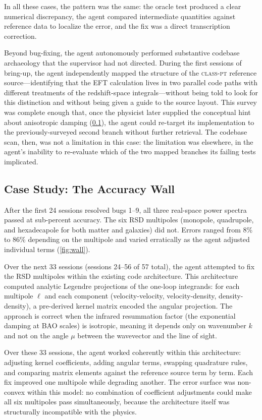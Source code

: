 \documentclass{article}
\newcommand{\classpt}{\textsc{class-pt}\xspace}
\begin{document}
In all these cases, the pattern was the same: the oracle test produced a clear numerical discrepancy, the agent compared intermediate quantities against reference data to localize the error, and the fix was a direct transcription correction.

Beyond bug-fixing, the agent autonomously performed substantive codebase archaeology that the supervisor had not directed. During the first sessions of bring-up, the agent independently mapped the structure of the \classpt reference source---identifying that the EFT calculation lives in two parallel code paths with different treatments of the redshift-space integrals---without being told to look for this distinction and without being given a guide to the source layout. This survey was complete enough that, once the physicist later supplied the conceptual hint about anisotropic damping (\cref{sec:wall}), the agent could re-target its implementation to the previously-surveyed second branch without further retrieval. The codebase scan, then, was not a limitation in this case: the limitation was elsewhere, in the agent's inability to re-evaluate which of the two mapped branches its failing tests implicated.

\subsection{Case Study: The Accuracy Wall}
\label{sec:wall}

After the first 24 sessions resolved bugs 1--9, all three real-space power spectra passed at sub-percent accuracy. The six RSD multipoles (monopole, quadrupole, and hexadecapole for both matter and galaxies) did not. Errors ranged from 8\% to 86\% depending on the multipole and varied erratically as the agent adjusted individual terms (\cref{fig:wall}).

Over the next 33 sessions (sessions 24--56 of 57 total), the agent attempted to fix the RSD multipoles within the existing code architecture. This architecture computed analytic Legendre projections of the one-loop integrands: for each multipole $\ell$ and each component (velocity-velocity, velocity-density, density-density), a pre-derived kernel matrix encoded the angular projection. The approach is correct when the infrared resummation factor (the exponential damping at BAO scales) is isotropic, meaning it depends only on wavenumber $k$ and not on the angle $\mu$ between the wavevector and the line of sight.

Over these 33 sessions, the agent worked coherently within this architecture: adjusting kernel coefficients, adding angular terms, swapping quadrature rules, and comparing matrix elements against the reference source term by term. Each fix improved one multipole while degrading another. The error surface was non-convex within this model: no combination of coefficient adjustments could make all six multipoles pass simultaneously, because the architecture itself was structurally incompatible with the physics.
\end{document}
